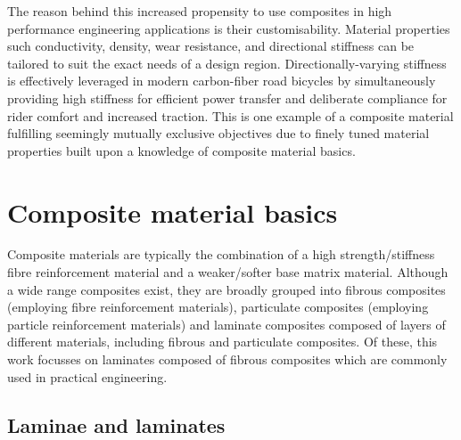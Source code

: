 The reason behind this increased propensity to use composites in high performance engineering applications is their customisability. Material properties such conductivity, density, wear resistance, and directional stiffness can be tailored to suit the exact needs of a design region. Directionally-varying stiffness is effectively leveraged in modern carbon-fiber road bicycles by simultaneously providing high stiffness for efficient power transfer and deliberate compliance for rider comfort and increased traction. This is one example of a composite material fulfilling seemingly mutually exclusive objectives due to finely tuned material properties built upon a knowledge of composite material basics.

\section{Composite material basics}

Composite materials are typically the combination of a high strength/stiffness fibre reinforcement material and a weaker/softer base matrix material. Although a wide range composites exist, they are broadly grouped into fibrous composites (employing fibre reinforcement materials), particulate composites (employing particle reinforcement materials) and laminate composites composed of layers of different materials, including fibrous and particulate composites. Of these, this work focusses on laminates composed of fibrous composites which are commonly used in practical engineering.

\subsection{Laminae and laminates}

